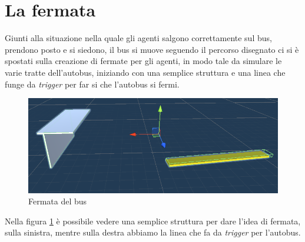 \documentclass[12pt, openany]{book}
\begin{document}
	\section{La fermata}
	Giunti alla situazione nella quale gli agenti salgono correttamente sul bus, prendono posto e si siedono, il bus si muove seguendo il percorso disegnato ci si è spostati sulla creazione di fermate per gli agenti, in modo tale da simulare le varie tratte dell'autobus, iniziando con una semplice struttura e una linea che funge da \emph{trigger} per far si che l'autobus si fermi.\\
	\begin{figure}[H]
		\centering
		\includegraphics[width=1\linewidth]{"Immagini/BusStopNoSA.png"}
		\caption{Fermata del bus}
		\label{fig:BusStopNoSA}
	\end{figure}
	Nella figura \ref{fig:BusStopNoSA} è possibile vedere una semplice struttura per dare l'idea di fermata, sulla sinistra, mentre sulla destra abbiamo la linea che fa da \emph{trigger} per l'autobus.\\
	
\end{document}
